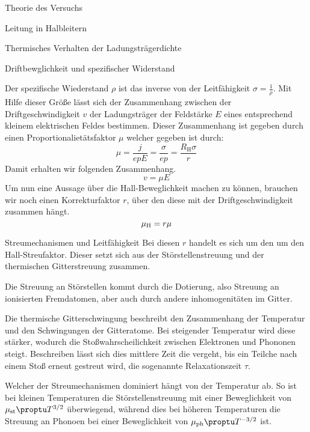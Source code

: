 \documentclass[pdftex, a4paper,11pt, twoside, ngerman]{report}
\begin{document}
\begin{chapter}{Theorie des Versuchs}
\begin{section}{Leitung in Halbleitern}
\begin{subsection}{Thermisches Verhalten der Ladungsträgerdichte}
        \end{subsection}


        \begin{subsection}{Driftbewglichkeit und spezifischer Widerstand}

            Der spezifische Wiederstand $\rho$ ist das inverse von der Leitfähigkeit $\sigma = \frac 1\rho$.
            Mit Hilfe dieser Größe lässt sich der Zusammenhang zwischen der Driftgeschwindigkeit $v$ der Ladungsträger der Feldstärke $E$ eines entsprechend kleinem elektrischen Feldes bestimmen.
            Dieser Zusammenhang ist gegeben durch einen Proportionalietätsfaktor $\mu$ welcher gegeben ist durch:
            \[
                \mu = \frac j{epE} = \frac \sigma{ep} = \frac{R_\text{H} \sigma}r
            \]
            Damit erhalten wir folgenden Zusammenhang.
            \[
                v = \mu E
            \]
            Um nun eine Aussage über die Hall-Beweglichkeit machen zu können, brauchen wir noch einen Korrekturfaktor $r$, über den diese mit der Driftgeschwindigkeit zusammen hängt.
            \[
                \mu_\text H =r\mu
            \]

        \end{subsection}

         \begin{subsection}{Streumechanismen und Leitfähigkeit}
             Bei diesen $r$ handelt es sich um den um den Hall-Streufaktor.
             Dieser setzt sich aus der Störstellenstreuung und der thermischen Gitterstreuung zusammen.
             
             Die Streuung an Störstellen kommt durch die Dotierung, also Streuung an ionisierten Fremdatomen, aber auch durch andere inhomogenitäten im Gitter.

             Die thermische Gitterschwingung beschreibt den Zusammenhang der Temperatur und den Schwingungen der Gitteratome. 
             Bei steigender Temperatur wird diese stärker, wodurch die Stoßwahrscheilichkeit zwischen Elektronen und Phononen steigt.
             Beschreiben lässt sich dies mittlere Zeit die vergeht, bis ein Teilche nach einem Stoß erneut gestreut wird, die sogenannte Relaxationszeit $\tau$.

             Welcher der Streumechanismen dominiert hängt von der Temperatur ab.
             So ist bei kleinen Temperaturen die Störstellenstreuung mit einer Beweglichkeit von $\mu_\text{st} \proptu T^{3/2}$ überwiegend, während dies bei höheren Temperaturen die Streuung an Phonoen bei einer Beweglichkeit von $\mu_\text{ph} \proptu T^{-3/2}$ ist.


\end{subsection}
\end{section}
\end{chapter}
\end{document}
